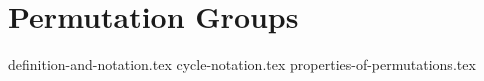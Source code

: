 \chapter{Permutation Groups}
{definition-and-notation.tex}
{cycle-notation.tex}
{properties-of-permutations.tex}
